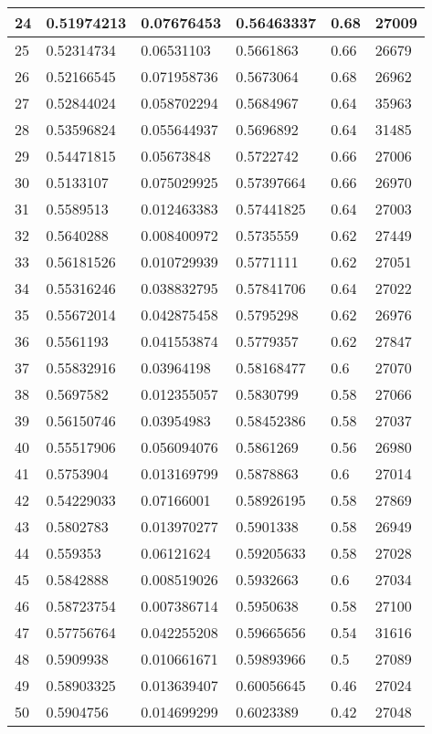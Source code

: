 \begin{longtable}{|l|l|l|l|l|l|}
24 & 0.51974213 & 0.07676453 & 0.56463337 & 0.68 & 27009 \\ \hline 
25 & 0.52314734 & 0.06531103 & 0.5661863 & 0.66 & 26679 \\ \hline 
26 & 0.52166545 & 0.071958736 & 0.5673064 & 0.68 & 26962 \\ \hline 
27 & 0.52844024 & 0.058702294 & 0.5684967 & 0.64 & 35963 \\ \hline 
28 & 0.53596824 & 0.055644937 & 0.5696892 & 0.64 & 31485 \\ \hline 
29 & 0.54471815 & 0.05673848 & 0.5722742 & 0.66 & 27006 \\ \hline 
30 & 0.5133107 & 0.075029925 & 0.57397664 & 0.66 & 26970 \\ \hline 
31 & 0.5589513 & 0.012463383 & 0.57441825 & 0.64 & 27003 \\ \hline 
32 & 0.5640288 & 0.008400972 & 0.5735559 & 0.62 & 27449 \\ \hline 
33 & 0.56181526 & 0.010729939 & 0.5771111 & 0.62 & 27051 \\ \hline 
34 & 0.55316246 & 0.038832795 & 0.57841706 & 0.64 & 27022 \\ \hline 
35 & 0.55672014 & 0.042875458 & 0.5795298 & 0.62 & 26976 \\ \hline 
36 & 0.5561193 & 0.041553874 & 0.5779357 & 0.62 & 27847 \\ \hline 
37 & 0.55832916 & 0.03964198 & 0.58168477 & 0.6 & 27070 \\ \hline 
38 & 0.5697582 & 0.012355057 & 0.5830799 & 0.58 & 27066 \\ \hline 
39 & 0.56150746 & 0.03954983 & 0.58452386 & 0.58 & 27037 \\ \hline 
40 & 0.55517906 & 0.056094076 & 0.5861269 & 0.56 & 26980 \\ \hline 
41 & 0.5753904 & 0.013169799 & 0.5878863 & 0.6 & 27014 \\ \hline 
42 & 0.54229033 & 0.07166001 & 0.58926195 & 0.58 & 27869 \\ \hline 
43 & 0.5802783 & 0.013970277 & 0.5901338 & 0.58 & 26949 \\ \hline 
44 & 0.559353 & 0.06121624 & 0.59205633 & 0.58 & 27028 \\ \hline 
45 & 0.5842888 & 0.008519026 & 0.5932663 & 0.6 & 27034 \\ \hline 
46 & 0.58723754 & 0.007386714 & 0.5950638 & 0.58 & 27100 \\ \hline 
47 & 0.57756764 & 0.042255208 & 0.59665656 & 0.54 & 31616 \\ \hline 
48 & 0.5909938 & 0.010661671 & 0.59893966 & 0.5 & 27089 \\ \hline 
49 & 0.58903325 & 0.013639407 & 0.60056645 & 0.46 & 27024 \\ \hline 
50 & 0.5904756 & 0.014699299 & 0.6023389 & 0.42 & 27048 \\ \hline 
\end{longtable}